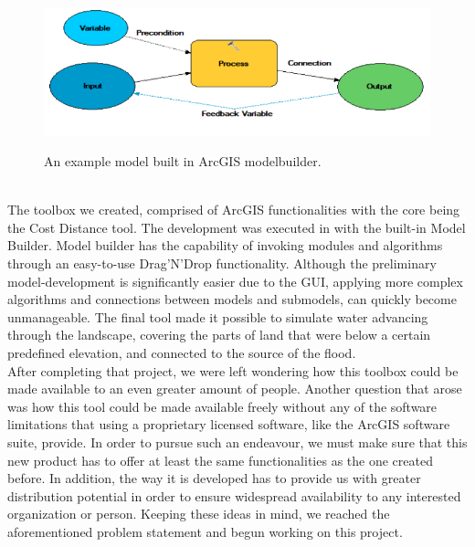 \begin{figure}[h!]
\centering
	{\includegraphics[width=\linewidth]{gfx/Methodology/old_project.png}}
\caption{An example model built in ArcGIS modelbuilder.}
\label{fig:inputs}
\end{figure}\\

The toolbox we created, comprised of ArcGIS functionalities with the core being the Cost Distance tool. The development was executed in with the built-in Model Builder. Model builder has the capability of invoking modules and algorithms through an easy-to-use Drag'N'Drop functionality. Although the preliminary model-development is significantly easier due to the GUI, applying more complex algorithms and connections between models and submodels, can quickly become unmanageable. 
The final tool made it possible to simulate water advancing through the landscape, covering the parts of land that were below a certain predefined elevation, and connected to the source of the flood. \\

After completing that project, we were left wondering how this toolbox could be made available to an even greater amount of people. Another question that arose was how this tool could be made available freely without any of the software limitations that using a proprietary licensed software, like the ArcGIS software suite, provide.
In order to pursue such an endeavour, we must make sure that this new product has to offer at least the same functionalities as the one created before. In addition, the way it is developed has to provide us with greater distribution potential in order to ensure widespread availability to any interested organization or person. Keeping these ideas in mind, we reached the aforementioned problem statement and begun working on this project.

